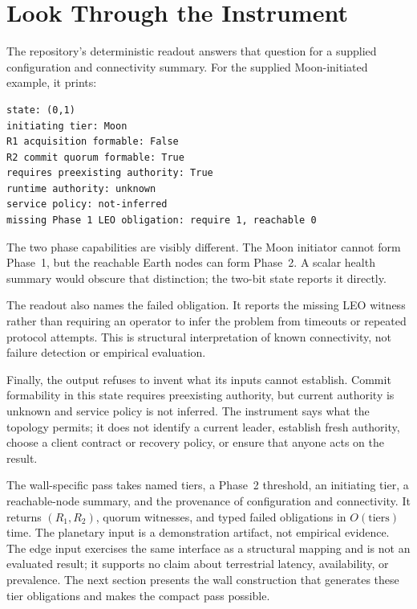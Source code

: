 \documentclass[letterpaper,twocolumn,10pt]{article}
\begin{document}
\section{Look Through the Instrument}
\label{sec:reading}
\label{sec:liveness-wall}

The repository's deterministic readout answers that question for a supplied configuration and connectivity summary. For the supplied Moon-initiated example, it prints:

{\scriptsize
\begin{verbatim}
state: (0,1)
initiating tier: Moon
R1 acquisition formable: False
R2 commit quorum formable: True
requires preexisting authority: True
runtime authority: unknown
service policy: not-inferred
missing Phase 1 LEO obligation: require 1, reachable 0
\end{verbatim}
}

The two phase capabilities are visibly different. The Moon initiator cannot form Phase~1, but the reachable Earth nodes can form Phase~2. A scalar health summary would obscure that distinction; the two-bit state reports it directly.

The readout also names the failed obligation. It reports the missing LEO witness rather than requiring an operator to infer the problem from timeouts or repeated protocol attempts. This is structural interpretation of known connectivity, not failure detection or empirical evaluation.

Finally, the output refuses to invent what its inputs cannot establish. Commit formability in this state requires preexisting authority, but current authority is unknown and service policy is not inferred. The instrument says what the topology permits; it does not identify a current leader, establish fresh authority, choose a client contract or recovery policy, or ensure that anyone acts on the result.

The wall-specific pass takes named tiers, a Phase~2 threshold, an initiating tier, a reachable-node summary, and the provenance of configuration and connectivity. It returns $(R_1,R_2)$, quorum witnesses, and typed failed obligations in $O(\text{tiers})$ time. The planetary input is a demonstration artifact, not empirical evidence. The edge input exercises the same interface as a structural mapping and is not an evaluated result; it supports no claim about terrestrial latency, availability, or prevalence. The next section presents the wall construction that generates these tier obligations and makes the compact pass possible.
\end{document}
